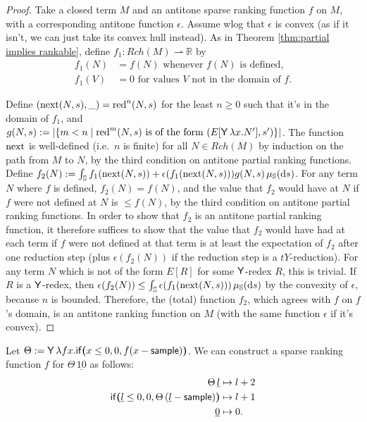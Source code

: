 \AntitonePartial*
\begin{proof}
  Take a closed term $M$ and an antitone sparse ranking function $f$ on $M$, with a corresponding antitone function $\epsilon$. Assume wlog that $\epsilon$ is convex (as if it isn't, we can just take its convex hull instead). As in Theorem \ref{thm:partial implies rankable}, define $f_1 : Rch(M) \rightharpoonup \mathbb R$ by
  \begin{align*}
    f_1(N) &= f(N) \text{ whenever $f(N)$ is defined},\\
    f_1(V) &= 0 \text{ for values $V$ not in the domain of $f$.}
  \end{align*}


  Define $(\operatorname{next}(N,s),\_) = \operatorname{red}^n(N,s)$ for the least $n \geq 0$ such that it's in the domain of $f_1$, and $g(N,s) := \left | \{m < n \mid \operatorname{red}^m(N,s) \text{ is of the form } (E[\mathsf{Y}\, \lambda x. N'],s') \} \right |$. 
  The function $\operatorname{next}$ is well-defined (i.e.~$n$ is finite) for all $N \in Rch(M)$ by induction on the path from $M$ to $N$, by the third condition on antitone partial ranking functions. Define $f_2(N) := \int_{\mathbb{S}} f_1(\operatorname{next}(N,s)) + \epsilon(f_1(\operatorname{next}(N,s))) g(N,s) \, \mu_{{\mathbb{S}}}(\mathrm d s)$. For any term $N$ where $f$ is defined, $f_2(N) = f(N)$, and the value that $f_2$ would have at $N$ if $f$ were not defined at $N$ is $\leq f(N)$, by the third condition on antitone partial ranking functions. In order to show that $f_2$ is an antitone partial ranking function, it therefore suffices to show that the value that $f_2$ would have had at each term if $f$ were not defined at that term is at least the expectation of $f_2$ after one reduction step (plus $\epsilon(f_2(N))$ if the reduction step is a $tY$-reduction). For any term $N$ which is not of the form $E[R]$ for some $\mathsf{Y}$-redex $R$, this is trivial. If $R$ is a $\mathsf{Y}$-redex, then $\epsilon(f_2(N)) \leq \int_{\mathbb{S}} \epsilon(f_1(\operatorname{next}(N,s)))\, \mu_{{\mathbb{S}}}(\mathrm d s)$ by the convexity of $\epsilon$, because $n$ is bounded. Therefore, the (total) function $f_2$, which agrees with $f$ on $f$'s domain, is an antitone ranking function on $M$ (with the same function $\epsilon$ if it's convex).
\end{proof}


Let $\Theta := \mathsf{Y} \, \lambda f x . \mathsf{if}\boldsymbol{(}x \leq 0, 0, f(x - \mathsf{sample})\boldsymbol{)}$. 
We can construct a sparse ranking function $f$ for $\Theta \, \underline{10}$ as follows:
\begin{align*}
\Theta \, \underline l 
&\mapsto 
l + 2
\\
\mathsf{if}\boldsymbol{(}\underline l \leq 0, 0, \Theta \, (\underline l - \mathsf{sample})\boldsymbol{)}
&\mapsto
l + 1
\\
\underline 0 &\mapsto 0.
\end{align*}

